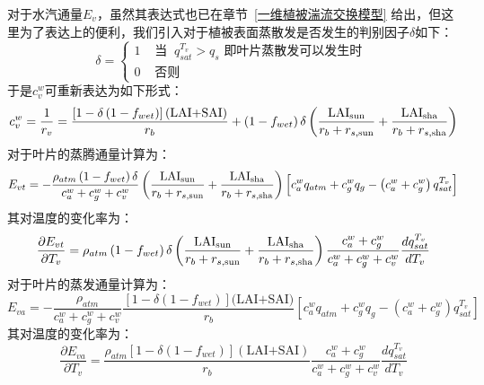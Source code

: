 对于水汽通量$E_{v}$，虽然其表达式也已在章节~\ref{一维植被湍流交换模型} 给出，但这里为了表达上的便利，我们引入对于植被表面蒸散发是否发生的判别因子$\delta$如下：
\begin{equation}
\delta=\left\{\begin{array}{cc}1 & \text { 当 }\ q_{s a t}^{T_{v}}>q_{s} \text { 即叶片蒸散发可以发生时 } \\ 0 & \text { 否则 }\end{array}\right.
\end{equation}
于是$c_v^w$可重新表达为如下形式：
\begin{equation}
c_{v}^{w}=\frac{1}{r_{v}}=\frac{\left[1-\delta\left(1-f_{wet}\right)\right](\text{LAI+SAI})}{r_{b}}+\left( 1 - f_{wet} \right)\delta\left( \frac{\rm LAI_{sun}}{r_{b} + r_{s,\rm sun}} + \frac{\rm LAI_{sha}}{r_{b} + r_{s,\rm sha}} \right)
\end{equation}
对于叶片的蒸腾通量计算为：
\begin{equation}
E_{vt} = -\frac{\rho_{atm}\left(1-f_{w e t}\right)\delta }{c_{a}^{w}+c_{g}^{w}+c_{v}^{w}}\left( \frac{\rm LAI_{sun}}{r_{b} + r_{s,\rm sun}} + \frac{\rm LAI_{sha}}{r_{b} + r_{s,\rm sha}} \right) \left[c_{a}^{w} q_{atm}+c_{g}^{w} q_{g}-\left(c_{a}^{w}+c_{g}^{w}\right) q_{s a t}^{T_{v}}\right] 
\end{equation}
其对温度的变化率为：
\begin{equation}
\frac{\partial E_{vt}}{\partial T_{v}} = \rho_{atm} \left(1-f_{w e t}\right) \delta \left( \frac{\rm LAI_{sun}}{r_{b} + r_{s, \rm sun}} + \frac{\rm LAI_{sha}}{r_{b} + r_{s,\rm sha}} \right)\frac{c_{a}^{w}+c_{g}^{w}}{c_{a}^{w}+c_{g}^{w}+c_{v}^{w}} \frac{d q_{s a t}^{T_{v}}}{d T_{v}}
\end{equation}
对于叶片的蒸发通量计算为：
\begin{equation}
E_{va} = -\frac{\rho_{atm}}{c_{a}^{w}+c_{g}^{w}+c_{v}^{w}} \frac{\left[1-\delta\left(1-f_{w e t}\right)\right](\text {LAI+SAI)}}{r_{b}}\left[c_{a}^{w} q_{atm}+c_{g}^{w} q_{g}-\left(c_{a}^{w}+c_{g}^{w}\right) q_{sat}^{T_{v}}\right]
\end{equation}
其对温度的变化率为：
\begin{equation}
\frac{\partial E_{va}}{\partial T_{v}} = \frac{\rho_{atm}\left[1-\delta\left(1-f_{w e t}\right)\right](\text {LAI+SAI})}{r_{b}} \frac{c_{a}^{w}+c_{g}^{w}}{c_{a}^{w}+c_{g}^{w}+c_{v}^{w}} \frac{d q_{s a t}^{T_{v}}}{d T_{v}}
\end{equation}

